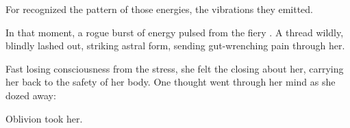  For \Esmerel{} recognized the pattern of those energies, the vibrations they emitted. 


In that moment, a rogue burst of energy pulsed from the fiery \vertex. A thread wildly, blindly lashed out, striking \Esmerelz{} astral form, sending gut-wrenching pain through her.

Fast losing consciousness from the stress, she felt the \sephiroth{} closing about her, carrying her back to the safety of her body. One thought went through her mind as she dozed away: 

Oblivion took her. 




